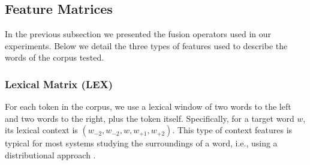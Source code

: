 \documentclass{llncs}
\begin{document}
\begin{enumerate}
	\end{enumerate}   
\subsection{Feature Matrices}
In the previous subsection we presented the fusion operators used in our experiments. Below we detail the three types of features used to describe the words of the corpus tested.
\subsubsection{Lexical Matrix (LEX)}
For each token in the corpus, we use a lexical window of two words to the left and two words to the right, plus the token itself. Specifically, for a target word $w$, its lexical context is $(w_{-2}, w_{-2}, w, w_{+1}, w_{+2})$. This type of context features is typical for most systems studying the surroundings of a word, i.e., using a distributional approach \cite{LevyG14}.
\end{document}
